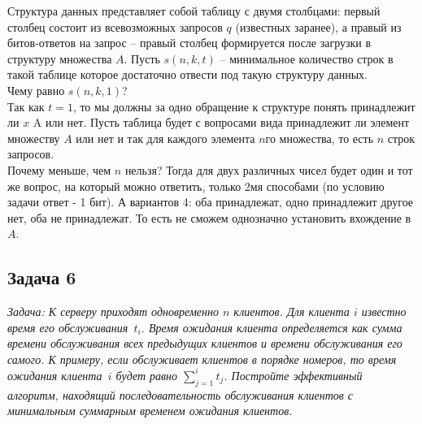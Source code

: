 \documentclass[a4paper,12pt]{article} %
\begin{document}
Структура данных представляет собой таблицу с двумя столбцами: первый столбец состоит из всевозможных запросов $q$ (известных заранее), а правый из битов-ответов на запрос -- правый столбец формируется после загрузки в структуру множества $A$.  Пусть $s(n,k,t)$ -- минимальное количество строк в такой таблице которое достаточно отвести под такую структуру данных.\\
Чему равно $s(n,k,1)$?\\


Так как $ t = 1 $, то мы должны за одно обращение к структуре понять принадлежит ли $ x $ A или нет. Пусть таблица будет с вопросами вида принадлежит ли элемент множеству $ A $ или нет и так для каждого элемента $ n $го множества, то есть $ n $ строк запросов.
\\ Почему меньше, чем $ n $ нельзя? Тогда для двух различных чисел будет один и тот же вопрос, на который можно ответить, только 2мя способами (по условию задачи ответ - 1 бит). А вариантов 4: оба принадлежат, одно принадлежит другое нет, оба не принадлежат. То есть не сможем однозначно установить вхождение в $ A $.



\subsection*{Задача 6}
\textit{Задача: К серверу приходят одновременно $n$ клиентов. Для клиента $i$ известно время его обслуживания~$t_i$. Время ожидания клиента определяется как сумма времени обслуживания всех предыдущих клиентов и времени обслуживания его самого. К примеру, если обслуживает клиентов в порядке номеров, то время ожидания клиента~$i$ будет равно $\sum\limits_{j=1}^{i} t_j$. Постройте эффективный алгоритм, находящий последовательность обслуживания клиентов с минимальным суммарным временем ожидания клиентов.}\\
\end{document}
